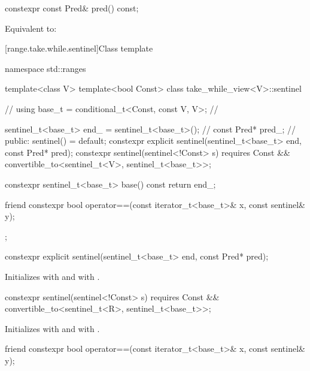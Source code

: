 \begin{itemdecl}
constexpr const Pred& pred() const;
\end{itemdecl}

\begin{itemdescr}
\pnum
\effects
Equivalent to: 
\end{itemdescr}

[range.take.while.sentinel]{Class template }
\begin{codeblock}
namespace std::ranges {
  template<class V>
  template<bool Const>
  class take_while_view<V>::sentinel {                  // \expos
    using base_t = conditional_t<Const, const V, V>;    // \expos

    sentinel_t<base_t> end_ = sentinel_t<base_t>();     // \expos
    const Pred* pred_{};                                // \expos
  public:
    sentinel() = default;
    constexpr explicit sentinel(sentinel_t<base_t> end, const Pred* pred);
    constexpr sentinel(sentinel<!Const> s)
      requires Const && convertible_to<sentinel_t<V>, sentinel_t<base_t>>;

    constexpr sentinel_t<base_t> base() const { return end_; }

    friend constexpr bool operator==(const iterator_t<base_t>& x, const sentinel& y);
  };
}
\end{codeblock}

\begin{itemdecl}
constexpr explicit sentinel(sentinel_t<base_t> end, const Pred* pred);
\end{itemdecl}

\begin{itemdescr}
\pnum
\effects
Initializes  with  and  with .
\end{itemdescr}

\begin{itemdecl}
constexpr sentinel(sentinel<!Const> s)
  requires Const && convertible_to<sentinel_t<R>, sentinel_t<base_t>>;
\end{itemdecl}

\begin{itemdescr}
\pnum
\effects
Initializes  with  and
 with .
\end{itemdescr}

\begin{itemdecl}
friend constexpr bool operator==(const iterator_t<base_t>& x, const sentinel& y);
\end{itemdecl}

